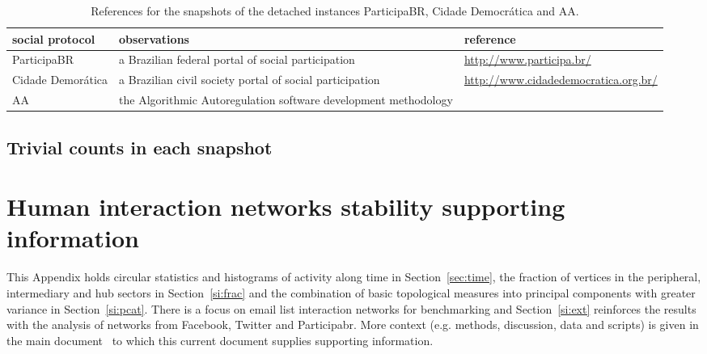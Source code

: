 \begin{apendicesenv}
																																	       \begin{table*}[h!]\scriptsize
																																		       \begin{center}
																																			       \caption{References for the snapshots of the detached instances
																																			       ParticipaBR, Cidade Democrática and AA.}\label{tab:provenance}
																																			       \begin{tabular}{| l || p{4cm} | p{3cm} | }\hline
																																				       \textbf{social protocol} & \textbf{observations} & \textbf{reference} \\\hline\hline
																																					       ParticipaBR & a Brazilian federal portal of social participation & \url{http://www.participa.br/} \\\hline
																																						   Cidade Demorática & a Brazilian civil society portal of social participation & \url{http://www.cidadedemocratica.org.br/} \\\hline
																																						       AA & the Algorithmic Autoregulation software development methodology & \cite{aarticle} \\\hline
																																			       \end{tabular}\end{center}
																																		       \end{table*}                    


																																		       \clearpage
																																		       \section{Trivial counts in each snapshot}
																																		       






																																	       \end{apendicesenv}
\chapter{Human interaction networks stability supporting information}\label{ap:losd}
 
This Appendix holds circular statistics and histograms of activity along time in Section~\ref{sec:time},
the fraction of vertices in the peripheral, intermediary and hub sectors in Section~\ref{si:frac}
and the combination of basic topological measures into principal components with greater variance in Section~\ref{si:pcat}.
There is a focus on email list interaction networks for benchmarking and
Section~\ref{si:ext} reinforces the results with the analysis of networks from Facebook, Twitter and Participabr.
More context (e.g. methods, discussion, data and scripts) is given in the main document~\cite{tpaper}
to which this current document supplies supporting information.

